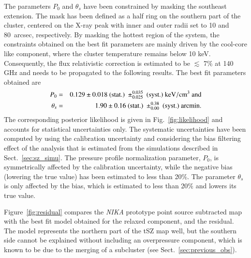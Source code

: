 The parameters $P_{0}$ and $\theta_s$ have been constrained by masking the southeast extension. The mask has been defined as a half ring on the southern part of the cluster, centered on the \mbox{X-ray} peak with inner and outer radii set to 10 and 80~arcsec, respectively. By masking the hottest region of the system, the constraints obtained on the best fit parameters are mainly driven by the cool-core like component, where the cluster temperature remains below 10 keV. Consequently, the flux relativistic correction \citep{itoh_1998, nozawa1998, nozawa2006} is estimated to be $\lesssim$ 7\% at 140 GHz and needs to be propagated to the following results. The best fit parameters obtained are
    	\begin{eqnarray}
	P_{0} & = & 0.129 \pm 0.018 \ (\mathrm{stat.}) \ \pm^{0.035}_{0.025} \ (\mathrm{syst.}) \ \mathrm{keV/cm}^3 \  {\rm and}\nonumber \\
	\theta_s & = &  1.90 \pm 0.16 \ (\mathrm{stat.}) \ \pm^{0.38}_{0.00} \ (\mathrm{syst.}) \ \mathrm{arcmin}.  
	\label{eq:best_fit_nika}
	\end{eqnarray}
The corresponding posterior likelihood is given in Fig.~\ref{fig:likelihood} and accounts for statistical uncertainties only. The systematic uncertainties have been computed by using the calibration uncertainty and considering the bias filtering effect of the analysis that is estimated from the simulations described in Sect.~\ref{sec:sz_simu}. The pressure profile normalization parameter, $P_{0}$, is symmetrically affected by the calibration uncertainty, while the negative bias (lowering the true value) has been estimated to less than 20\%. The parameter $\theta_s$ is only affected by the bias, which is estimated to less than 20\% and lowers its true value. 

Figure~\ref{fig:residual} compares the {\it NIKA} prototype point source subtracted map with the best fit model obtained for the relaxed component, and the residual. The model represents the northern part of the tSZ map well, but the southern side cannot be explained without including an overpressure component, which is known to be due to the merging of a subcluster (see Sect.~\ref{sec:previous_obs}).


